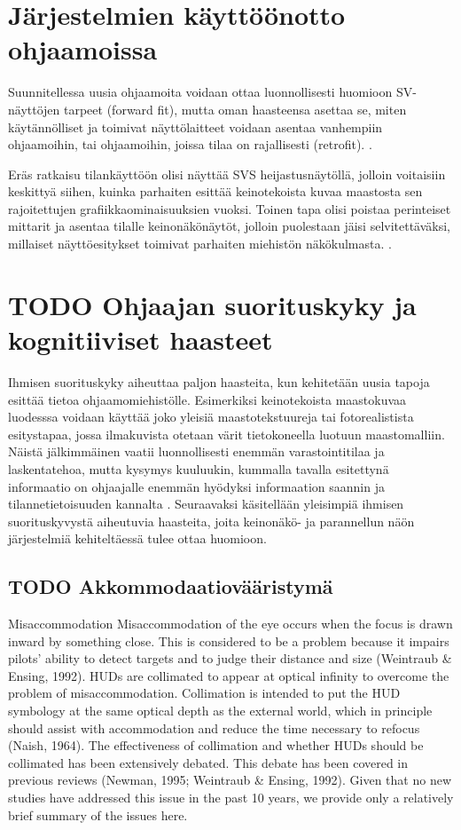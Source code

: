 \documentclass[utf8,bachelor,manualbib]{gradu3}
\begin{document}
\chapter{Järjestelmien käyttöönotto ohjaamoissa}

Suunnitellessa uusia ohjaamoita voidaan ottaa luonnollisesti huomioon SV-näyttöjen tarpeet (forward fit), mutta oman haasteensa asettaa se, miten käytännölliset ja toimivat näyttölaitteet voidaan asentaa vanhempiin ohjaamoihin, tai ohjaamoihin, joissa tilaa on rajallisesti (retrofit). \citep{prinzel2004}.

Eräs ratkaisu tilankäyttöön olisi näyttää SVS heijastusnäytöllä, jolloin voitaisiin keskittyä siihen, kuinka parhaiten esittää keinotekoista kuvaa maastosta sen rajoitettujen grafiikkaominaisuuksien vuoksi. Toinen tapa olisi poistaa perinteiset mittarit ja asentaa tilalle keinonäkönäytöt, jolloin puolestaan jäisi selvitettäväksi, millaiset näyttöesitykset toimivat parhaiten miehistön näkökulmasta. \citep{prinzel2004}.

\chapter{TODO Ohjaajan suorituskyky ja kognitiiviset haasteet}

Ihmisen suorituskyky aiheuttaa paljon haasteita, kun kehitetään uusia tapoja 
esittää tietoa ohjaamomiehistölle. Esimerkiksi keinotekoista maastokuvaa luodesssa voidaan käyttää joko yleisiä maastotekstuureja tai fotorealistista esitystapaa, jossa ilmakuvista otetaan värit tietokoneella luotuun maastomalliin. Näistä jälkimmäinen vaatii luonnollisesti enemmän varastointitilaa ja laskentatehoa, mutta kysymys kuuluukin, kummalla tavalla esitettynä informaatio on ohjaajalle enemmän hyödyksi informaation saannin ja tilannetietoisuuden kannalta \citep{prinzel2004}. Seuraavaksi käsitellään yleisimpiä ihmisen suorituskyvystä aiheutuvia haasteita, joita keinonäkö- ja parannellun näön järjestelmiä kehiteltäessä tulee ottaa huomioon.

\section{TODO Akkommodaatiovääristymä}

Misaccommodation
Misaccommodation of the eye occurs when the focus is drawn inward by something
close. This is considered to be a problem because it impairs pilots’ ability
to detect targets and to judge their distance and size (Weintraub \& Ensing,
1992). HUDs are collimated to appear at optical infinity to overcome the problem
of misaccommodation. Collimation is intended to put the HUD symbology
at the same optical depth as the external world, which in principle should assist
with accommodation and reduce the time necessary to refocus (Naish, 1964).
The effectiveness of collimation and whether HUDs should be collimated has
been extensively debated. This debate has been covered in previous reviews
(Newman, 1995; Weintraub \& Ensing, 1992). Given that no new studies have
addressed this issue in the past 10 years, we provide only a relatively brief summary
of the issues here.\citep{crawford2006}
\end{document}
